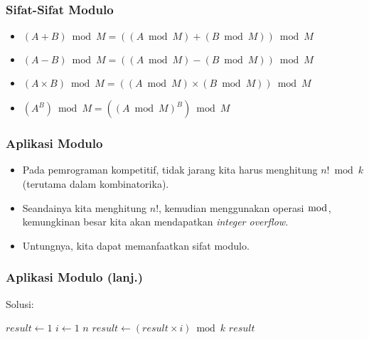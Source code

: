 \begin{frame}
\frametitle{Sifat-Sifat Modulo}
\begin{itemize}
  \item $(A + B) \bmod M = ((A \bmod M) + (B \bmod M)) \bmod M$
  \item $(A - B) \bmod M = ((A \bmod M) - (B \bmod M)) \bmod M$
  \item $(A \times B) \bmod M = ((A \bmod M) \times (B \bmod M)) \bmod M$  
  \item $(A^{B}) \bmod M = ((A \bmod M)^{B}) \bmod M$
\end{itemize}
\end{frame} 

\begin{frame}
\frametitle{Aplikasi Modulo}
\begin{itemize}
  \item Pada pemrograman kompetitif, tidak jarang kita harus menghitung $n! \bmod k$ (terutama dalam kombinatorika). 
  \item Seandainya kita menghitung $n!$, kemudian menggunakan operasi $\bmod$, kemungkinan besar kita akan mendapatkan \textit{integer overflow}.
  \item Untungnya, kita dapat memanfaatkan sifat modulo.
\end{itemize}
\end{frame}

\begin{frame}[fragile]
\frametitle{Aplikasi Modulo (lanj.)}
Solusi: 

\begin{codebox}
\li $result \gets 1$
\li \For $i \gets 1$ \To $n$
    \Do
\li   $result \gets (result \times i) \bmod k$
    \End
\li \Return $result$    
\end{codebox}

\end{frame}

